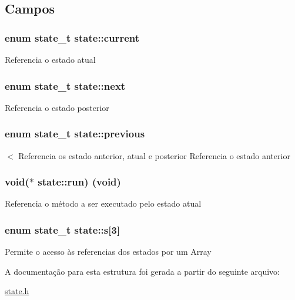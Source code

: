\subsection{Campos}
\subsubsection[{\texorpdfstring{current}{current}}]{\setlength{\rightskip}{0pt plus 5cm}enum {\bf state\+\_\+t} state\+::current}\hypertarget{structstate_aa23ac3f3183e79172bab91684e0195e1}{}\label{structstate_aa23ac3f3183e79172bab91684e0195e1}
Referencia o estado atual 
\subsubsection[{\texorpdfstring{next}{next}}]{\setlength{\rightskip}{0pt plus 5cm}enum {\bf state\+\_\+t} state\+::next}\hypertarget{structstate_a24e4d9ff5dc7891e048ee578ba970837}{}\label{structstate_a24e4d9ff5dc7891e048ee578ba970837}
Referencia o estado posterior 
\subsubsection[{\texorpdfstring{previous}{previous}}]{\setlength{\rightskip}{0pt plus 5cm}enum {\bf state\+\_\+t} state\+::previous}\hypertarget{structstate_a276d20af15eb7cc14800557d670eb8a5}{}\label{structstate_a276d20af15eb7cc14800557d670eb8a5}
$<$ Referencia os estado anterior, atual e posterior Referencia o estado anterior 
\subsubsection[{\texorpdfstring{run}{run}}]{\setlength{\rightskip}{0pt plus 5cm}void($\ast$ state\+::run) (void)}\hypertarget{structstate_a90aac7b165377e812886e60e28d054bf}{}\label{structstate_a90aac7b165377e812886e60e28d054bf}
Referencia o método a ser executado pelo estado atual 
\subsubsection[{\texorpdfstring{s}{s}}]{\setlength{\rightskip}{0pt plus 5cm}enum {\bf state\+\_\+t} state\+::s\mbox{[}3\mbox{]}}\hypertarget{structstate_a8a9de0cd847e8ae900e15eb66fe408f2}{}\label{structstate_a8a9de0cd847e8ae900e15eb66fe408f2}
Permite o acesso às referencias dos estados por um Array 

A documentação para esta estrutura foi gerada a partir do seguinte arquivo\+:\begin{DoxyCompactItemize}
\item 
\hyperlink{state_8h}{state.\+h}\end{DoxyCompactItemize}
